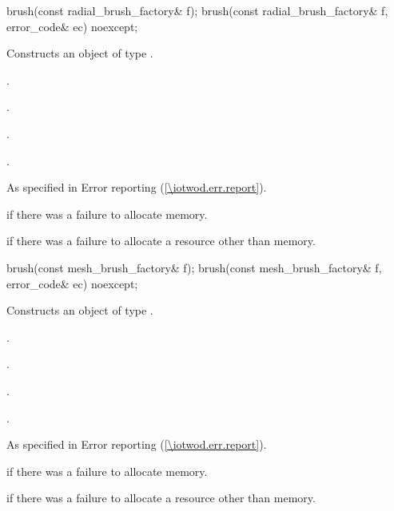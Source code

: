 \begin{itemdecl}
    brush(const radial_brush_factory& f);
    brush(const radial_brush_factory& f, error_code& ec) noexcept;
\end{itemdecl}
\begin{itemdescr}
	\pnum
	\effects
	Constructs an object of type .
	
	\pnum
	\postconditions
	.
	
	.
	
	.
	
	.

	\pnum
	\throws
	As specified in Error reporting (\ref{\iotwod.err.report}).
	
	\pnum
	\errors
	 if there was a failure to allocate memory.
	
	 if there was a failure to allocate a resource other than memory.
	
\end{itemdescr}

\begin{itemdecl}
    brush(const mesh_brush_factory& f);
    brush(const mesh_brush_factory& f, error_code& ec) noexcept;
\end{itemdecl}
\begin{itemdescr}
	\pnum
	\effects
	Constructs an object of type .
	
	\pnum
	\postconditions
	.
	
	.
	
	.
	
	.

	\pnum
	\throws
	As specified in Error reporting (\ref{\iotwod.err.report}).
	
	\pnum
	\errors
	 if there was a failure to allocate memory.
	
	 if there was a failure to allocate a resource other than memory.
	
\end{itemdescr}

